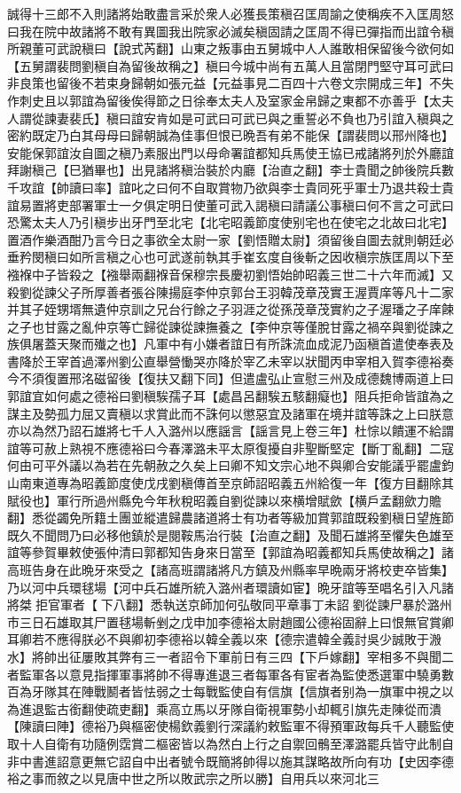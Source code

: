 誠得十三郎不入則諸將始敢盡言采於衆人必獲長策稹召匡周諭之使稱疾不入匡周怒曰我在院中故諸將不敢有異圖我出院家必滅矣稹固請之匡周不得已彈指而出誼令稹所親董可武說稹曰【說式芮翻】山東之叛事由五舅城中人人誰敢相保留後今欲何如【五舅謂裴問劉稹自為留後故稱之】稹曰今城中尚有五萬人且當閉門堅守耳可武曰非良策也留後不若束身歸朝如張元益【元益事見二百四十六卷文宗開成三年】不失作刺史且以郭誼為留後俟得節之日徐奉太夫人及室家金帛歸之東都不亦善乎【太夫人謂從諫妻裴氏】稹曰誼安肯如是可武曰可武已與之重誓必不負也乃引誼入稹與之密約既定乃白其母母曰歸朝誠為佳事但恨已晩吾有弟不能保【謂裴問以邢州降也】安能保郭誼汝自圖之稹乃素服出門以母命署誼都知兵馬使王協已戒諸將列於外廳誼拜謝稹己【巳猶畢也】出見諸將稹治裝於内廳【治直之翻】李士貴聞之帥後院兵數千攻誼【帥讀曰率】誼叱之曰何不自取賞物乃欲與李士貴同死乎軍士乃退共殺士貴誼易置將吏部署軍士一夕俱定明日使董可武入謁稹曰請議公事稹曰何不言之可武曰恐驚太夫人乃引稹步出牙門至北宅【北宅昭義節度使别宅也在使宅之北故曰北宅】置酒作樂酒酣乃言今日之事欲全太尉一家【劉悟贈太尉】須留後自圖去就則朝廷必垂矜閔稹曰如所言稹之心也可武遂前執其手崔玄度自後斬之因收稹宗族匡周以下至襁褓中子皆殺之【襁舉兩翻褓音保穆宗長慶初劉悟始帥昭義三世二十六年而滅】又殺劉從諫父子所厚善者張谷陳揚庭李仲京郭台王羽韓茂章茂實王渥賈庠等凡十二家并其子姪甥壻無遺仲京訓之兄台行餘之子羽涯之從孫茂章茂實約之子渥璠之子庠餗之子也甘露之亂仲京等亡歸從諫從諫撫養之【李仲京等僅脫甘露之禍卒與劉從諫之族俱屠蓋天聚而殱之也】凡軍中有小嫌者誼日有所誅流血成泥乃函稹首遣使奉表及書降於王宰首過澤州劉公直舉營慟哭亦降於宰乙未宰以狀聞丙申宰相入賀李德裕奏今不須復置邢洺磁留後【復扶又翻下同】但遣盧弘止宣慰三州及成德魏博兩道上曰郭誼宜如何處之德裕曰劉稹騃孺子耳【處昌呂翻騃五駭翻癡也】阻兵拒命皆誼為之謀主及勢孤力屈又賣稹以求賞此而不誅何以懲惡宜及諸軍在境并誼等誅之上曰朕意亦以為然乃詔石雄將七千人入潞州以應謡言【謡言見上卷三年】杜悰以饋運不給謂誼等可赦上熟視不應德裕曰今春澤潞未平太原復擾自非聖斷堅定【斷丁亂翻】二寇何由可平外議以為若在先朝赦之久矣上曰卿不知文宗心地不與卿合安能議乎罷盧鈞山南東道專為昭義節度使戊戌劉稹傳首至京師詔昭義五州給復一年【復方目翻除其賦役也】軍行所過州縣免今年秋稅昭義自劉從諫以來横增賦歛【横戶孟翻歛力贍翻】悉從蠲免所籍土團並縱遣歸農諸道將士有功者等級加賞郭誼既殺劉稹日望旌節既久不聞問乃曰必移他鎮於是閱鞍馬治行裝【治直之翻】及聞石雄將至懼失色雄至誼等參賀畢敕使張仲清曰郭都知告身來日當至【郭誼為昭義都知兵馬使故稱之】諸高班告身在此晩牙來受之【諸高班謂諸將凡方鎮及州縣率早晩兩牙將校吏卒皆集】乃以河中兵環毬場【河中兵石雄所統入潞州者環讀如宦】晩牙誼等至唱名引入凡諸將桀拒官軍者【下八翻】悉執送京師加何弘敬同平章事丁未詔劉從諫尸暴於潞州市三日石雄取其尸置毬場斬剉之戊申加李德裕太尉趙國公德裕固辭上曰恨無官賞卿耳卿若不應得朕必不與卿初李德裕以韓全義以來【德宗遣韓全義討吳少誠敗于溵水】將帥出征屢敗其弊有三一者詔令下軍前日有三四【下戶嫁翻】宰相多不與聞二者監軍各以意見指揮軍事將帥不得專進退三者每軍各有宦者為監使悉選軍中驍勇數百為牙隊其在陣戰鬭者皆怯弱之士每戰監使自有信旗【信旗者别為一旗軍中視之以為進退監古銜翻使疏吏翻】乘高立馬以牙隊自衛視軍勢小却輒引旗先走陳從而潰【陳讀曰陣】德裕乃與樞密使楊欽義劉行深議約敕監軍不得預軍政每兵千人聽監使取十人自衛有功隨例霑賞二樞密皆以為然白上行之自禦回鶻至澤潞罷兵皆守此制自非中書進詔意更無它詔自中出者號令既簡將帥得以施其謀略故所向有功【史因李德裕之事而敘之以見唐中世之所以敗武宗之所以勝】自用兵以來河北三